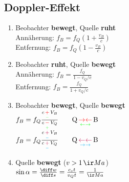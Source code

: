 \documentclass[german]{latex4ei/latex4ei_sheet}
\begin{document}
\subsection{Doppler-Effekt}
\begin{sectionbox}
\begin{enumerate}
	\item Beobachter \textbf{bewegt}, Quelle \textbf{ruht}\\
		Annäherung: $f_B=f_Q(1+\frac{v_B}{c})$\\
		Entfernung: $f_B=f_Q(1-\frac{v_B}{c})$
	\item Beobachter \textbf{ruht}, Quelle \textbf{bewegt}\\
		Annäherung: $f_B=\frac{f_Q}{1-v_Q/c}$\\
		Entfernung: $f_B=\frac{f_Q}{1+v_Q/c}$
	\item Beobachter \textbf{bewegt}, Quelle \textbf{bewegt}\\
		$f_B = f_Q \frac{c \, \underset{\textcolor{green}{-}}{\textcolor{red}{+}} \, V_B}{c \, \underset{\textcolor{green}{+}}{\textcolor{red}{-}} \, V_Q} \qquad \text{Q} \, \underset{\textcolor{green}{\leftarrow} \textcolor{green}{\rightarrow}}{\textcolor{red}{\rightarrow} \textcolor{red}{\leftarrow}} \, \text{B}$\\
		$f_B = f_Q \frac{c \, \underset{\textcolor{cyan}{-}}{\textcolor{purple}{+}} \, V_B}{c \, \underset{\textcolor{cyan}{-}}{\textcolor{purple}{+}} \, V_Q} \qquad \text{Q} \, \underset{\textcolor{cyan}{\rightarrow} \textcolor{cyan}{\rightarrow}}{\textcolor{purple}{\leftarrow} \textcolor{purple}{\leftarrow}} \, \text{B}$
	\item Quelle \textbf{bewegt} ($v>1 \, \ir Ma$)\\
		$\sin \alpha=\frac{\diff w}{\diff s}=\frac{c_s t}{v_Qt}=\frac{1}{\ir Ma}$
\end{enumerate}
\end{sectionbox}
\end{document}
